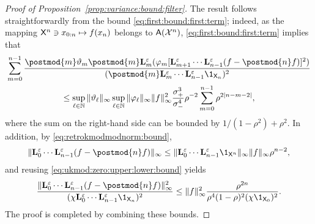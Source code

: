 \begin{proof}[Proof of Proposition~\ref{prop:variance:bound:filter}]
The result follows straightforwardly from the bound \eqref{eq:first:bound:first:term}; indeed, as the mapping $\mathsf{X}^n \ni x_{0:n} \mapsto f(x_n)$ belongs to $\mathsf{A}(\mathcal{X}^n)$, \eqref{eq:first:bound:first:term} implies that 
\begin{multline*}
\sum_{m = 0}^{n - 1} \frac{\postmod{m} \adjfuncforward{m} \postmod{m} \ukmod{m}(\varphi_m [\ukmod{m + 1} \cdots \ukmod{n - 1} (f - \postmod{n} f)
]^2)}{(\postmod{m} \ukmod{m} \cdots \ukmod{n - 1} \1_{\Xset_n})^2} \\ 
\leq \sup_{\ell \in \nset} \| \adjfuncforward{\ell} \|_\infty \sup_{\ell \in \nset} \| \varphi_\ell \|_\infty \|f \|_\infty^2 \frac{\udup^3}{\udlow^4} \rho^{-2}
\sum_{m = 0}^{n - 1} \rho^{2 |n - m - 2|},  
\end{multline*}
where the sum on the right-hand side can be bounded by $1 / (1 - \rho^2) + \rho^2$. In addition, by \eqref{eq:retrokmodmodnorm:bound}, 
$$
\| \ukmod{0} \cdots \ukmod{n - 1} (f - \postmod{n} f) \|_\infty \leq \| \ukmod{0} \cdots \ukmod{n - 1} \1_{\Xset^n} \|_\infty \|f \|_\infty \rho^{n - 2}, 
$$
and reusing \eqref{eq:ukmod:zero:upper:lower:bound} yields 
$$
\frac{\| \ukmod{0} \cdots \ukmod{n - 1} (f - \postmod{n} f) \|_\infty^2}{(\chi \ukmod{0} \cdots \ukmod{n - 1} \1_{\Xset_n})^2} \leq \| f \|_\infty^2 \frac{\rho^{2n}}{\rho^4(1 - \rho)^2 (\chi \1_{\Xset_0})^2}. 
$$
The proof is completed by combining these bounds. 
\end{proof}

